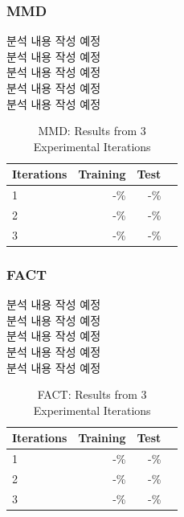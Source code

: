\subsubsection{MMD}
분석 내용 작성 예정\\
분석 내용 작성 예정\\
분석 내용 작성 예정\\
분석 내용 작성 예정\\
분석 내용 작성 예정\\
\begin{table}[h]
  \centering
  \begin{tabular}{lrrr}
  \toprule
  Iterations & Training & Test \\
  \midrule
  1 & -\% & -\% \\
  2 & -\% & -\% \\
  3 & -\% & -\% \\
  \bottomrule
  \end{tabular}
  \caption{MMD: Results from 3 Experimental Iterations}
  \label{tab:MMD: Results from 3 Experimental Iterations}
\end{table}

\subsubsection{FACT}
분석 내용 작성 예정\\
분석 내용 작성 예정\\
분석 내용 작성 예정\\
분석 내용 작성 예정\\
분석 내용 작성 예정\\
\begin{table}[h]
  \centering
  \begin{tabular}{lrrr}
  \toprule
  Iterations & Training & Test \\
  \midrule
  1 & -\% & -\% \\
  2 & -\% & -\% \\
  3 & -\% & -\% \\
  \bottomrule
  \end{tabular}
  \caption{FACT: Results from 3 Experimental Iterations}
  \label{tab:FACT: Results from 3 Experimental Iterations}
\end{table}

